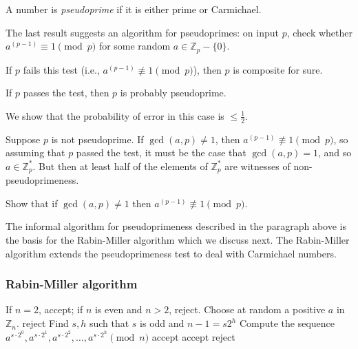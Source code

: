 \begin{frame}
A number is {\em pseudoprime} if it is either prime or Carmichael.

The last result suggests an algorithm for pseudoprimes: on input $p$,
check whether $a^{(p-1)}\equiv 1\pmod p$ for some random
$a\in\mathbb{Z}_p-\{0\}$.  

If $p$ fails this test (i.e.,
$a^{(p-1)}\not\equiv 1\pmod p$), then $p$ is composite for sure.  

If
$p$ passes the test, then $p$ is probably pseudoprime.  

We show that
the probability of error in this case is $\le\frac{1}{2}$.  

Suppose
$p$ is not pseudoprime.  If $\gcd(a,p)\neq 1$, then
$a^{(p-1)}\not\equiv 1\pmod p$, so assuming that $p$ passed the test,
it must be the case that $\gcd(a,p)=1$, and so $a\in\mathbb{Z}_p^*$.
But then at least half of the elements
of $\mathbb{Z}_p^*$ are witnesses of non-pseudoprimeness.
\end{frame}

\begin{frame}
Show that if $\gcd(a,p)\neq 1$ then $a^{(p-1)}\not\equiv 1\pmod p$.

The informal algorithm for pseudoprimeness described in the paragraph
above is the basis for the Rabin-Miller algorithm which we discuss
next.  The Rabin-Miller algorithm extends the pseudoprimeness test to
deal with Carmichael numbers.

\end{frame}

\begin{frame}
\frametitle{Rabin-Miller algorithm}

\begin{algorithmic}[1] 
   \STATE  If $n=2$, accept; if $n$ is even and $n>2$, reject. 
   \STATE  Choose at random a positive $a$ in $\mathbb{Z}_n$. 
       \STATE reject
   \ELSE 
            \STATE Find $s,h$ such that $s$ is odd and $n-1=s2^h$
            \STATE Compute the sequence
                $a^{s\cdot 2^0},a^{s\cdot 2^1},a^{s\cdot 2^2},
                 \ldots,a^{s\cdot 2^h}\pmod n$
            \STATE accept
            \STATE accept
      \ELSE 
            \STATE reject
      \ENDIF
    \ENDIF
\end{algorithmic}

\end{frame}

